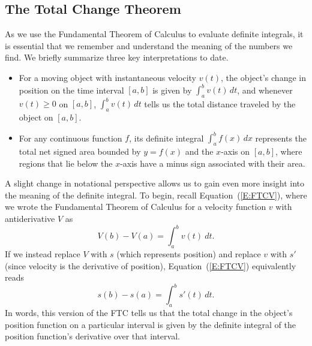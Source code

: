 
\subsection*{The Total Change Theorem} 

As we use the Fundamental Theorem of Calculus to evaluate definite integrals, it is essential that we remember and understand the meaning of the numbers we find.  We briefly summarize three key interpretations to date.
\begin{itemize}
\item For a moving object with instantaneous velocity $v(t)$, the object's change in position on the time interval $[a,b]$ is given by $\int_a^b v(t) \, dt$, and whenever $v(t) \ge 0$ on $[a,b]$, $\int_a^b v(t) \, dt$ tells us the total distance traveled by the object on $[a,b]$.  

\item For any continuous function $f$, its definite integral $\int_a^b f(x) \, dx$ represents the total net signed area bounded by $y = f(x)$ and the $x$-axis on $[a,b]$, where regions that lie below the $x$-axis have a minus sign associated with their area.  

\end{itemize}

A slight change in notational perspective allows us to gain even more insight into the meaning of the definite integral.  To begin, recall Equation~(\ref{E:FTCV}), where we wrote the Fundamental Theorem of Calculus for a velocity function $v$ with antiderivative $V$ as
\[ V(b) - V(a) = \int_a^b v(t) \ dt. \]
If we instead replace $V$ with $s$ (which represents position) and replace $v$ with $s'$ (since velocity is the derivative of position), Equation~(\ref{E:FTCV}) equivalently reads 
\begin{equation} \label{E:FTCs} %
s(b) - s(a) = \int_a^b s'(t) \, dt.
\end{equation}
In words, this version of the FTC tells us that the total change in the object's position function on a particular interval is given by the definite integral of the position function's derivative over that interval.

